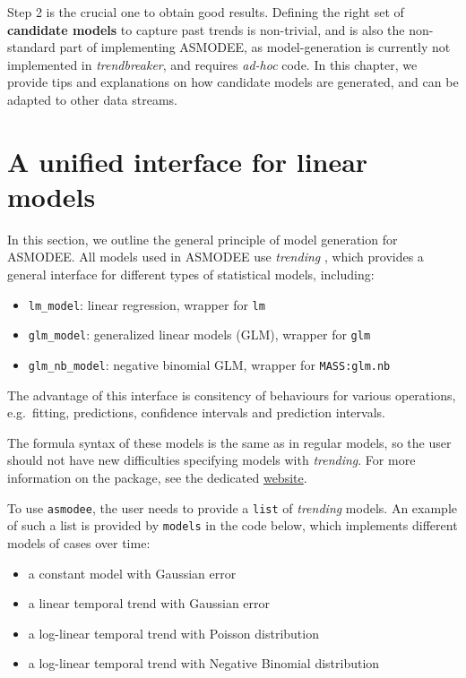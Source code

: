 \documentclass[]{book}
\providecommand{\tightlist}{%
  \setlength{\itemsep}{0pt}\setlength{\parskip}{0pt}}
\begin{document}
Step 2 is the crucial one to obtain good results. Defining the right set of
\textbf{candidate models} to capture past trends is non-trivial, and is also the
non-standard part of implementing ASMODEE, as model-generation is currently not
implemented in \emph{trendbreaker}, and requires \emph{ad-hoc} code. In this chapter, we
provide tips and explanations on how candidate models are generated, and can be
adapted to other data streams.

\hypertarget{a-unified-interface-for-linear-models}{%
\section{A unified interface for linear models}\label{a-unified-interface-for-linear-models}}

In this section, we outline the general principle of model generation for
ASMODEE. All models used in ASMODEE use \emph{trending} \citep{R-trending}, which
provides a general interface for different types of statistical models,
including:

\begin{itemize}
\tightlist
\item
  \texttt{lm\_model}: linear regression, wrapper for \texttt{lm}
\item
  \texttt{glm\_model}: generalized linear models (GLM), wrapper for \texttt{glm}
\item
  \texttt{glm\_nb\_model}: negative binomial GLM, wrapper for \texttt{MASS:glm.nb}
\end{itemize}

The advantage of this interface is consitency of behaviours for various
operations, e.g.~fitting, predictions, confidence intervals and prediction
intervals.

The formula syntax of these models is the same as in regular models, so the user
should not have new difficulties specifying models with \emph{trending}.
For more information on the package, see the dedicated
\href{https://www.repidemicsconsortium.org/trending/}{website}.

To use \texttt{asmodee}, the user needs to provide a \texttt{list} of \emph{trending} models. An
example of such a list is provided by \texttt{models} in the code below, which
implements different models of cases over time:

\begin{itemize}
\tightlist
\item
  a constant model with Gaussian error
\item
  a linear temporal trend with Gaussian error
\item
  a log-linear temporal trend with Poisson distribution
\item
  a log-linear temporal trend with Negative Binomial distribution
\end{itemize}
\end{document}
